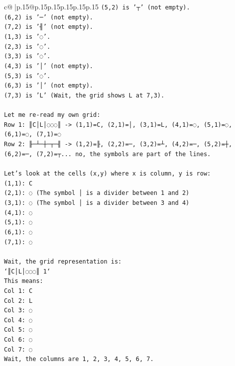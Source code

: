 \documentclass{article}
\begin{document}
{\begin{supertabular}{c@{$\;$}|p{.15\linewidth}@{}p{.15\linewidth}p{.15\linewidth}p{.15\linewidth}p{.15\linewidth}p{.15\linewidth}}
{{{\texttt{(5,2) is '┬' (not empty).} \\
\texttt{(6,2) is '─' (not empty).} \\
\texttt{(7,2) is '╢' (not empty).} \\
\texttt{(1,3) is '◌'.} \\
\texttt{(2,3) is '◌'.} \\
\texttt{(3,3) is '◌'.} \\
\texttt{(4,3) is '│' (not empty).} \\
\texttt{(5,3) is '◌'.} \\
\texttt{(6,3) is '│' (not empty).} \\
\texttt{(7,3) is 'L' (Wait, the grid shows L at 7,3).} \\
\\ 
\texttt{Let me re{-}read my own grid:} \\
\texttt{Row 1: ║C│L│◌◌◌║ {-}> (1,1)=C, (2,1)=│, (3,1)=L, (4,1)=◌, (5,1)=◌, (6,1)=◌, (7,1)=◌} \\
\texttt{Row 2: ╟─┴─┼─┬─╢ {-}> (1,2)=╟, (2,2)=─, (3,2)=┴, (4,2)=─, (5,2)=┼, (6,2)=─, (7,2)=┬... no, the symbols are part of the lines.} \\
\\ 
\texttt{Let's look at the cells (x,y) where x is column, y is row:} \\
\texttt{(1,1): C} \\
\texttt{(2,1): ◌ (The symbol │ is a divider between 1 and 2)} \\
\texttt{(3,1): ◌ (The symbol │ is a divider between 3 and 4)} \\
\texttt{(4,1): ◌} \\
\texttt{(5,1): ◌} \\
\texttt{(6,1): ◌} \\
\texttt{(7,1): ◌} \\
\\ 
\texttt{Wait, the grid representation is:} \\
\texttt{`║C│L│◌◌◌║ 1`} \\
\texttt{This means:} \\
\texttt{Col 1: C} \\
\texttt{Col 2: L} \\
\texttt{Col 3: ◌} \\
\texttt{Col 4: ◌} \\
\texttt{Col 5: ◌} \\
\texttt{Col 6: ◌} \\
\texttt{Col 7: ◌} \\
\texttt{Wait, the columns are 1, 2, 3, 4, 5, 6, 7.} \\
}}}
\end{supertabular}}
\end{document}
